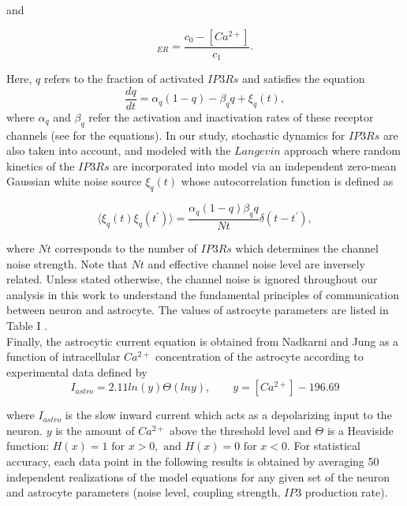 \documentclass[%
 aip,
 amsmath,amssymb,
 reprint,%
]{revtex4-1}
\begin{document}
	and
	
	\begin{equation}
		[Ca^{2+}]_{ER}=\frac {c_{0}-[Ca^{2+}]} {c_{1}}.              
	\end{equation}
	
	Here, $q$ refers to the fraction of activated $IP3Rs$ and satisfies the equation
		\begin{equation}
		\frac{dq}{dt}=\alpha_{q}(1-q)-\beta_{q}q+\xi_{q}(t),
	\end{equation}
where $\alpha_{q}$ and $\beta_{q}$ refer the activation and inactivation rates of these receptor channels (see \cite{nadkarni2003} for the equations). In our study,  stochastic dynamics for $IP3Rs$ are also taken into account, and modeled with the $Langevin$ approach where random kinetics of the $IP3Rs$ are incorporated into model via an independent zero-mean Gaussian white  noise source $\xi_{q}(t)$ whose autocorrelation function is defined as \cite {tang2016}
	
	\begin{equation}
		\langle \xi_{q}(t)\xi_{q}(t^{'})\rangle=\frac {\alpha_{q}(1-q)\beta_{q}q}{Nt}\delta(t-t^{'}),
	\end{equation}
	
	\noindent where  $Nt$ corresponds to the number of $IP3Rs$ which determines the channel noise strength. Note that $Nt$ and effective channel noise level are inversely related. Unless stated otherwise, the channel noise is ignored throughout our analysis in this work to understand the fundamental principles of communication between neuron and astrocyte. The values of  astrocyte parameters are listed in Table I \cite{Volman2007, Postnow2009}.\\
	
	Finally, the astrocytic current equation is obtained from Nadkarni and Jung \cite{nadkarni2003} as a function of intracellular $Ca^{2+}$ concentration of the astrocyte according to experimental data defined by
	\begin{equation}
		I_{astro}=2.11ln(y)\Theta(lny), \qquad  y=[Ca^{2+}]-196.69
	\end{equation}
	
	\noindent where $I_{astro}$ is  the slow inward current which acts as a depolarizing input to the neuron. $y$ is the amount of $Ca^{2+}$ above the threshold level and $\Theta$ is a Heaviside function: $H(x)=1\mbox{ for } x>0, \mbox{ and } H(x)=0 \mbox{ for } x<0$. For statistical accuracy, each data point in the following results is obtained by averaging 50 independent realizations of the model equations for any given set of the neuron and astrocyte parameters (noise level, coupling strength, $IP3$ production rate).\\
	
\end{document}
